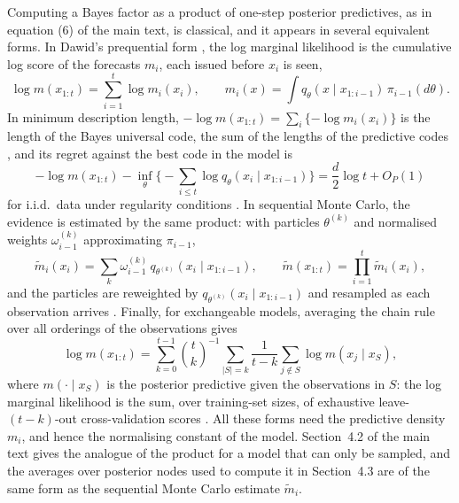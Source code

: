 \documentclass[11pt]{article}
\theoremstyle{remark}
\begin{document}
Computing a Bayes factor as a product of one-step posterior predictives, as in
equation (6) of the main text, is classical, and it appears in several equivalent
forms. In Dawid's prequential form \citep{dawid1984present}, the log marginal
likelihood is the cumulative log score of the forecasts $m_i$, each issued
before $x_i$ is seen,
\[
\log m(x_{1:t}) = \sum_{i=1}^{t} \log m_i(x_i),
\qquad
m_i(x) = \int q_\theta(x \mid x_{1:i-1})\,\pi_{i-1}(d\theta).
\]
In minimum description length, $-\log m(x_{1:t}) = \sum_i \{-\log m_i(x_i)\}$
is the length of the Bayes universal code, the sum of the lengths of the
predictive codes \citep{rissanen1984universal,grunwald2007minimum}, and its
regret against the best code in the model is
\[
-\log m(x_{1:t}) - \inf_\theta \Big\{-\sum_{i \le t}\log q_\theta(x_i \mid x_{1:i-1})\Big\}
= \frac d2 \log t + O_P(1)
\]
for i.i.d.\ data under regularity conditions \citep{clarke1990information}.
In sequential Monte Carlo, the evidence is estimated by the same product: with
particles $\theta^{(k)}$ and normalised weights $\omega_{i-1}^{(k)}$ approximating
$\pi_{i-1}$,
\[
\tilde m_i(x_i) = \sum_{k} \omega_{i-1}^{(k)}\, q_{\theta^{(k)}}(x_i \mid x_{1:i-1}),
\qquad
\tilde m(x_{1:t}) = \prod_{i=1}^{t} \tilde m_i(x_i),
\]
and the particles are reweighted by $q_{\theta^{(k)}}(x_i \mid x_{1:i-1})$ and
resampled as each observation arrives \citep{kong1994sequential,chopin2002sequential}.
Finally, for exchangeable models, averaging the chain rule over all orderings of
the observations gives
\[
\log m(x_{1:t}) = \sum_{k=0}^{t-1} \binom{t}{k}^{-1} \sum_{|S| = k}
\frac{1}{t-k} \sum_{j \notin S} \log m(x_j \mid x_S),
\]
where $m(\cdot \mid x_S)$ is the posterior predictive given the observations in
$S$: the log marginal likelihood is the sum, over training-set sizes, of
exhaustive leave-$(t-k)$-out cross-validation scores \citep{fong2020marginal}.
All these forms need the predictive density $m_i$, and hence the normalising
constant of the model. Section~4.2 of the main text gives the analogue of the
product for a model that can only be sampled, and the averages over posterior
nodes used to compute it in Section~4.3 are of the same form as the
sequential Monte Carlo estimate $\tilde m_i$.



\end{document}
